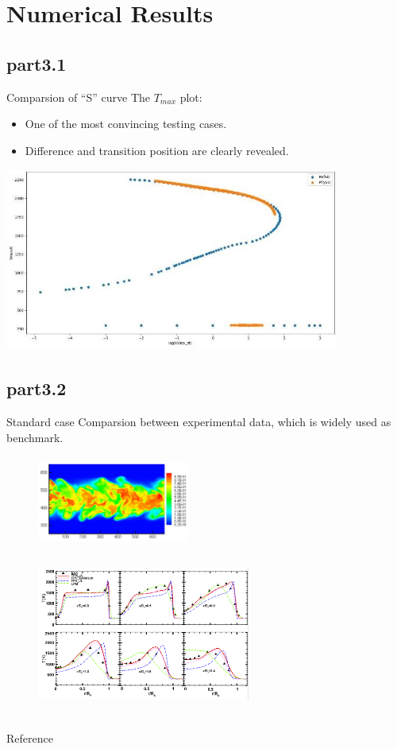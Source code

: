 \section{Numerical Results}
	\subsection{part3.1}
		\begin{xframe}{Comparsion of ``S'' curve}
			The $T_{max}$ plot:
			\begin{itemize}
				\item
					One of the most convincing testing cases.
				\item
					Difference and transition position are clearly revealed\cite{RN11}.
			\end{itemize}			
			\includegraphics[width=11cm, height=6cm]{../pic/Tmax.jpg}	
		\end{xframe}
	\subsection{part3.2}
		\begin{xframe}{Standard case}
			Comparsion between experimental data, which is widely used as benchmark\cite{RN14}.
			\begin{figure}
				\begin{minipage}{3.5cm}
					\centering
					\includegraphics[height=3cm, width=5cm]{../pic/slice.png}
				\end{minipage}%
				\begin{minipage}{7.5cm}
					\centering
					\includegraphics[height=5.5cm, width=7cm]{../pic/line.png}
				\end{minipage}%
			\end{figure}
		\end{xframe}

	\begin{xframe}{Reference}
		\printbibliography
	\end{xframe}


